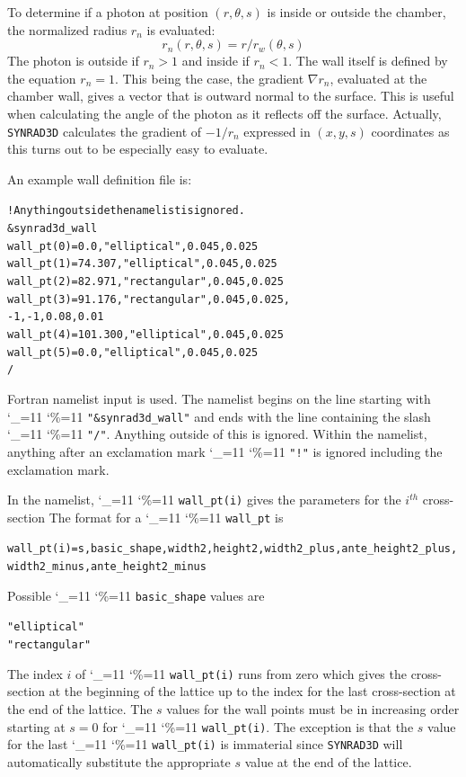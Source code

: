 \documentclass[11pt]{article}
\newcommand{\srthree}{\texttt{SYNRAD3D}\xspace}
\newcommand\ttcmd{\begingroup\catcode`\_=11 \catcode`\%=11 \dottcmd}
\newcommand\dottcmd[1]{\texttt{#1}\endgroup}
\newcommand{\Begineq}{\begin{equation}}
\newcommand{\Endeq}{\end{equation}}
\newcommand{\vn}{\ttcmd}
\newcommand{\Th}{$^{th}$\xspace}
\newlength{\ExBeg}
\newlength{\ExEnd}
\newenvironment{example}
  {\vspace{\ExBeg} \begin{alltt}}
  {\end{alltt} \vspace{\ExEnd}}
\begin{document}
To determine if a photon at position $(r, \theta, s)$ is inside or outside the
chamber, the normalized radius $r_n$ is evaluated:
\Begineq
  r_n(r, \theta, s) = r / r_w(\theta, s)
\Endeq
The photon is outside if $r_n > 1$ and inside if $r_n < 1$. The wall
itself is defined by the equation $r_n = 1$. This being the case, the
gradient $\nabla r_n$, evaluated at the chamber wall, gives a vector
that is outward normal to the surface. This is useful when calculating
the angle of the photon as it reflects off the surface. Actually,
\srthree calculates the gradient of $-1/r_n$ expressed in $(x, y, s)$
coordinates as this turns out to be especially easy to evaluate.

An example wall definition file is:
\begin{example}
  ! Anything outside the namelist is ignored.
  &synrad3d_wall
   wall_pt(0) = 0.0, "elliptical", 0.045, 0.025
   wall_pt(1) = 74.307, "elliptical", 0.045, 0.025
   wall_pt(2) = 82.971, "rectangular", 0.045, 0.025
   wall_pt(3) = 91.176, "rectangular", 0.045, 0.025,
                            -1, -1, 0.08, 0.01
   wall_pt(4) = 101.300, "elliptical", 0.045, 0.025
   wall_pt(5) = 0.0, "elliptical", 0.045, 0.025
  /
\end{example}
Fortran namelist input is used. 
The namelist begins on the line starting with \vn{"\&synrad3d_wall"}
and ends with the line containing the slash \vn{"/"}. Anything outside
of this is ignored. Within the namelist, anything after an exclamation
mark \vn{"!"} is ignored including the exclamation mark. 

In the namelist, \vn{wall_pt(i)} gives the parameters for the $i$\Th
cross-section The format for a \vn{wall_pt} is
\begin{example}
  wall_pt(i) = s, basic_shape, width2, height2, width2_plus, ante_height2_plus, 
                  width2_minus, ante_height2_minus
\end{example}
Possible \vn{basic_shape} values are
\begin{example}
  "elliptical"
  "rectangular"
\end{example}

The index $i$ of \vn{wall_pt(i)} runs from zero which gives the
cross-section at the beginning of the lattice up to the index for the
last cross-section at the end of the lattice. The $s$ values for the
wall points must be in increasing order starting at $s = 0$ for
\vn{wall_pt(i)}. The exception is that the $s$ value for the last
\vn{wall_pt(i)} is immaterial since \srthree will automatically substitute
the appropriate $s$ value at the end of the lattice.
\end{document}
